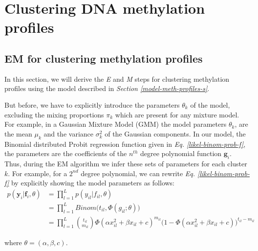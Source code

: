 \section{Clustering DNA methylation profiles} \label{cluster-meth-s}

\subsection{EM for clustering methylation profiles}
In this section, we will derive the \emph{E} and \emph{M} steps for clustering methylation profiles using the model described in \emph{Section \ref{model-meth-profiles-s}}.

But before, we have to explicitly introduce the parameters $\theta_{k}$ of the model, excluding the mixing proportions $\pi_{k}$ which are present for any mixture model. For example, in a Gaussian Mixture Model (GMM) the model parameters $\theta_{k}$, are the mean $\mu_{k}$ and the variance $\sigma_{k}^{2}$ of the Gaussian components. In our model, the Binomial distributed Probit regression function given in \emph{Eq. \ref{likel-binom-prob-f}}, the parameters are the coefficients of the $n^{th}$ degree polynomial function $\mathbf{g}_{i}$. Thus, during the EM algorithm we infer these sets of parameters for each cluster $k$. For example, for a $2^{nd}$ degree polynomial, we can rewrite \emph{Eq. \ref{likel-binom-prob-f}} by explicitly showing the model parameters as follows:
\begin{equation} \label{likel-binom-prob-example1-f}
  \begin{split}
	p(\mathbf{y}_{i}|\mathbf{f}_{i}, \theta) & = \prod_{l=1}^{L} p(y_{il}|f_{il}, \theta) \\
							 & = \prod_{l=1}^{L} Binom \big(t_{il}, \Phi(g_{il}; \theta)\big) \\
							 & = \prod_{l=1}^{L} \binom{t_{il}}{m_{il}} \Phi(\alpha x_{il}^{2} + \beta x_{il} + c)^{m_{il}} (1 - \Phi(\alpha x_{il}^{2} + \beta x_{il} + c)\big)^{t_{il} - m_{il}}
  \end{split}
\end{equation}

where $\theta = (\alpha, \beta, c)$.

